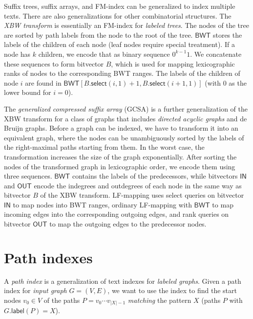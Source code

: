 \documentclass[a4paper,UKenglish]{lipics-v2016}
\newcommand{\abs}[1]{\ensuremath{\lvert #1 \rvert}}
\newcommand{\select}{\ensuremath{\mathsf{select}}}
\newcommand{\glabel}{\ensuremath{\mathsf{label}}}
\newcommand{\LFmapping}{LF\nobreakdash-mapping}
\newcommand{\FMindex}{FM\nobreakdash-index}
\newcommand{\BWT}{\ensuremath{\mathsf{BWT}}}
\newcommand{\bvIN}{\ensuremath{\mathsf{IN}}}
\newcommand{\bvOUT}{\ensuremath{\mathsf{OUT}}}
\begin{document}
Suffix trees, suffix arrays, and \FMindex{} can be generalized to index multiple texts. There are also generalizations for other combinatorial structures. The \emph{XBW transform} \cite{Ferragina2009b} is essentially an \FMindex{} for \emph{labeled trees}. The nodes of the tree are sorted by path labels from the node to the root of the tree. $\BWT$ stores the labels of the children of each node (leaf nodes require special treatment). If a node has $k$ children, we encode that as binary sequence $0^{k-1} 1$. We concatenate these sequences to form bitvector $B$, which is used for mapping lexicographic ranks of nodes to the corresponding BWT ranges. The labels of the children of node $i$ are found in $\BWT[B.\select(i, 1) + 1, B.\select(i + 1, 1)]$ (with $0$ as the lower bound for $i = 0$).

The \emph{generalized compressed suffix array} (GCSA) \cite{Siren2014} is a further generalization of the XBW transform for a class of graphs that includes \emph{directed acyclic graphs} and de Bruijn graphs. Before a graph can be indexed, we have to transform it into an equivalent graph, where the nodes can be unambiguously sorted by the labels of the right-maximal paths starting from them. In the worst case, the transformation increases the size of the graph exponentially. After sorting the nodes of the transformed graph in lexicographic order, we encode them using three sequences. $\BWT$ contains the labels of the predecessors, while bitvectors $\bvIN$ and $\bvOUT$ encode the indegrees and outdegrees of each node in the same way as bitvector $B$ of the XBW transform. \LFmapping{} uses select queries on bitvector $\bvIN$ to map nodes into BWT ranges, ordinary \LFmapping{} with $\BWT$ to map incoming edges into the corresponding outgoing edges, and rank queries on bitvector $\bvOUT$ to map the outgoing edges to the predecessor nodes.


\section{Path indexes}\label{sect:path-indexes}

A \emph{path index} is a generalization of text indexes for \emph{labeled graphs}. Given a path index for \emph{input graph} $G = (V, E)$, we want to use the index to find the start nodes $v_{0} \in V$ of the paths $P = v_{0} \dotsm v_{\abs{X}-1}$ \emph{matching} the pattern $X$ (paths $P$ with $G.\glabel(P) = X$).
\end{document}
